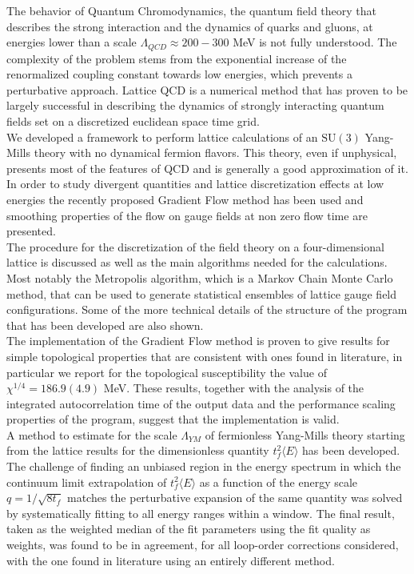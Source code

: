 The behavior of Quantum Chromodynamics, the quantum field theory that describes the strong interaction and the dynamics of quarks and gluons, at energies lower than a scale $\Lambda_{QCD} \approx 200-300$ MeV is not fully understood. The complexity of the problem stems from the exponential increase of the renormalized coupling constant towards low energies, which prevents a perturbative approach. Lattice QCD is a numerical method that has proven to be largely successful in describing the dynamics of strongly interacting quantum fields set on a discretized euclidean space time grid.\\

We developed a framework to perform lattice calculations of an $\mathrm{SU}(3)$ Yang-Mills theory with no dynamical fermion flavors. This theory, even if unphysical, presents most of the features of QCD and is generally a good approximation of it. In order to study divergent quantities and lattice discretization effects at low energies the recently proposed Gradient Flow method \cite{luscher_properties_2010} has been used and smoothing properties of the flow on gauge fields at non zero flow time are presented. \\
The procedure for the discretization of the field theory on a four-dimensional lattice is discussed as well as the main algorithms needed for the calculations. Most notably the Metropolis algorithm, which is a Markov Chain Monte Carlo method, that can be used to generate statistical ensembles of lattice gauge field configurations. Some of the more technical details of the structure of the program that has been developed are also shown.\\

The implementation of the Gradient Flow method is proven to give results for simple topological properties that are consistent with ones found in literature, in particular we report for the topological susceptibility the value of $\chi^{1/4} = 186.9(4.9)$ MeV. These results, together with the analysis of the integrated autocorrelation time of the output data and the performance scaling properties of the program, suggest that the implementation is valid.\\
A method to estimate for the scale $\Lambda_{YM}$ of fermionless Yang-Mills theory starting from the lattice results for the dimensionless quantity $t_f^2\langle E \rangle$ has been developed. The challenge of finding an unbiased region in the energy spectrum in which the continuum limit extrapolation of $t_f^2\langle E \rangle$ as a function of the energy scale $q=1/\sqrt{8t_f}$ matches the perturbative expansion of the same quantity was solved by systematically fitting to all energy ranges within a window. The final result, taken as the weighted median of the fit parameters using the fit quality as weights, was found to be in agreement, for all loop-order corrections considered, with the one found in literature \cite{capitani_non-perturbative_1999} using an entirely different method.
